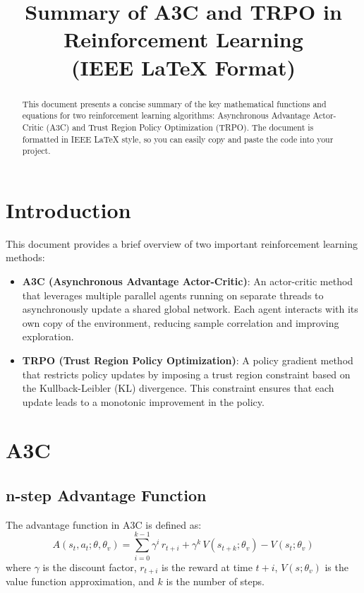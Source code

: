 \documentclass[conference]{IEEEtran}
\begin{document}
\title{Summary of A3C and TRPO in Reinforcement Learning \\ (IEEE LaTeX Format)}
\author{
}
\maketitle

\begin{abstract}
This document presents a concise summary of the key mathematical functions and equations for two reinforcement learning algorithms: Asynchronous Advantage Actor-Critic (A3C) and Trust Region Policy Optimization (TRPO). The document is formatted in IEEE LaTeX style, so you can easily copy and paste the code into your project.
\end{abstract}

\IEEEpeerreviewmaketitle

\section{Introduction}
This document provides a brief overview of two important reinforcement learning methods:
\begin{itemize}
    \item \textbf{A3C (Asynchronous Advantage Actor-Critic)}: An actor-critic method that leverages multiple parallel agents running on separate threads to asynchronously update a shared global network. Each agent interacts with its own copy of the environment, reducing sample correlation and improving exploration.
    \item \textbf{TRPO (Trust Region Policy Optimization)}: A policy gradient method that restricts policy updates by imposing a trust region constraint based on the Kullback-Leibler (KL) divergence. This constraint ensures that each update leads to a monotonic improvement in the policy.
\end{itemize}

\section{A3C}
\subsection{n-step Advantage Function}
The advantage function in A3C is defined as:
\begin{equation}
A(s_t, a_t; \theta, \theta_v) = \sum_{i=0}^{k-1} \gamma^i\, r_{t+i} + \gamma^k\, V(s_{t+k}; \theta_v) - V(s_t; \theta_v)
\end{equation}
where \( \gamma \) is the discount factor, \( r_{t+i} \) is the reward at time \( t+i \), \( V(s;\theta_v) \) is the value function approximation, and \( k \) is the number of steps.
\end{document}

